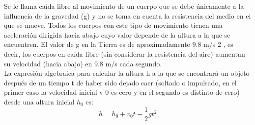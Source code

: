 Se le llama caída libre al movimiento de un cuerpo que se debe únicamente a la
influencia de la gravedad (g) y no se toma en cuenta la resistencia del medio en
el que se mueve. Todos los cuerpos con este tipo de movimiento tienen una aceleración dirigida hacia abajo cuyo valor depende de la altura a la que se encuentren. El valor de g en la Tierra es de aproximadamente 9.8 m/s 2 , es decir, los cuerpos
en caída libre (sin considerar la resistencia del aire) aumentan su velocidad (hacia
abajo) en 9.8 m/s cada segundo.\\

La expresión algebraica para calcular la altura h a la que se encontrará un objeto después de un tiempo t de haber sido dejado caer (soltado o impulsado, en
el primer caso la velocidad inicial v 0 es cero y en el segundo es distinto de cero)
desde una altura inicial $h_0$ es:
\begin{equation}\label{eq:caida_libre}
    h=h_0+v_0t-\dfrac{1}{2}gt^2
\end{equation}

